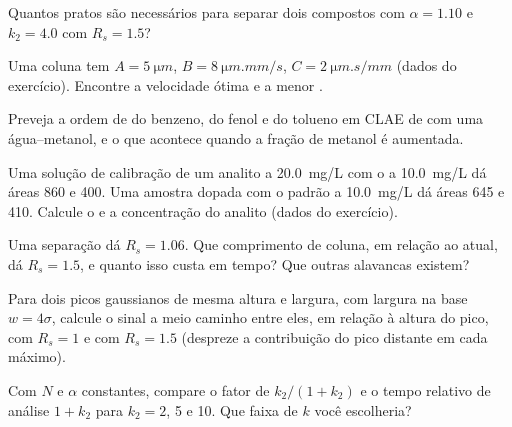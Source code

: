 \begin{exercise}[$\star\star$]\label{exo:b2:chromatography:6}
Quantos pratos são necessários para separar dois compostos com $\alpha = 1.10$ e $k_2 = 4.0$ com
$R_s = 1.5$?
\end{exercise}

\begin{exercise}[$\star\star$]\label{exo:b2:chromatography:7}
Uma coluna tem $A = \qty{5}{\micro m}$, $B = \qty{8}{\micro m.mm/s}$, $C = \qty{2}{\micro m.s/mm}$
(dados do exercício). Encontre a velocidade ótima e a menor .
\end{exercise}

\begin{exercise}[$\star\star$]\label{exo:b2:chromatography:8}
Preveja a ordem de  do benzeno, do fenol e do tolueno em CLAE de  com uma 
água--metanol, e o que acontece quando a fração de metanol é aumentada.
\end{exercise}

\begin{exercise}[$\star\star$]\label{exo:b2:chromatography:9}
Uma solução de calibração de um analito a \qty{20.0}{mg/L} com o  a \qty{10.0}{mg/L}
dá áreas 860 e 400. Uma amostra dopada com o padrão a \qty{10.0}{mg/L} dá áreas 645 e 410.
Calcule o  e a concentração do analito (dados do exercício).
\end{exercise}

\begin{exercise}[$\star\star\star$]\label{exo:b2:chromatography:10}
Uma separação dá $R_s = 1.06$. Que comprimento de coluna, em relação ao atual, dá $R_s = 1.5$, e quanto
isso custa em tempo? Que outras alavancas existem?
\end{exercise}

\begin{exercise}[$\star\star\star$]\label{exo:b2:chromatography:11}
Para dois picos gaussianos de mesma altura e largura, com largura na base $w = 4\sigma$, calcule o sinal
a meio caminho entre eles, em relação à altura do pico, com $R_s = 1$ e com $R_s = 1.5$ (despreze a
contribuição do pico distante em cada máximo).
\end{exercise}

\begin{exercise}[$\star\star\star$]\label{exo:b2:chromatography:12}
Com $N$ e $\alpha$ constantes, compare o fator de  $k_2/(1+k_2)$ e o tempo relativo de análise
$1 + k_2$ para $k_2 = 2$, 5 e 10. Que faixa de $k$ você escolheria?
\end{exercise}

